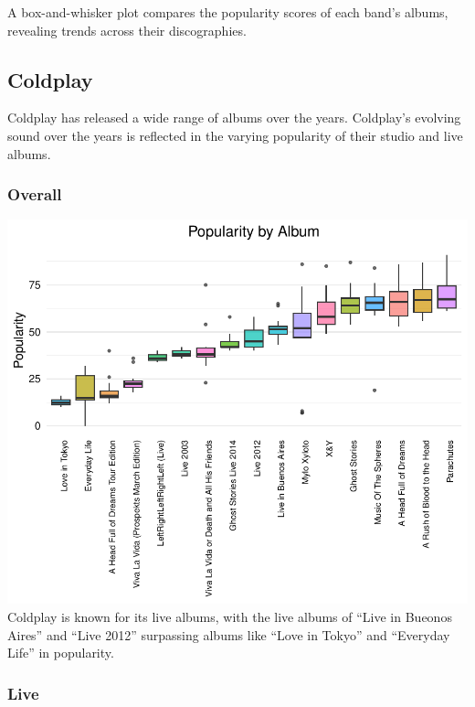 \documentclass[11pt,preprint]{elsarticle}
\numberwithin{equation}{section}
\numberwithin{figure}{section}
\numberwithin{table}{section}
\begin{document}
A box-and-whisker plot compares the popularity scores of each band's
albums, revealing trends across their discographies.

\subsection{Coldplay}\label{coldplay}

Coldplay has released a wide range of albums over the years. Coldplay's
evolving sound over the years is reflected in the varying popularity of
their studio and live albums.

\subsubsection{Overall}\label{overall}

\includegraphics{Question2_files/figure-latex/unnamed-chunk-1-1.pdf}
Coldplay is known for its live albums, with the live albums of ``Live in
Bueonos Aires'' and ``Live 2012'' surpassing albums like ``Love in
Tokyo'' and ``Everyday Life'' in popularity.

\newpage

\subsubsection{Live}\label{live}
\end{document}
